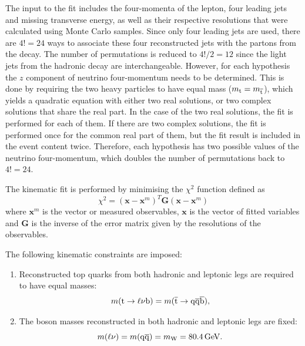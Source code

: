 The input to the fit includes the four-momenta of the lepton, four leading jets and missing transverse energy, as well
as their respective resolutions that were calculated using Monte Carlo samples. Since only four leading jets are used,
there are $4!=24$ ways to associate these four reconstructed jets with the partons from the \ttbar decay. The number of
permutations is reduced to $4!/2=12$ since the light jets from the hadronic \W decay are interchangeable. However, for
each hypothesis the $z$ component of neutrino four-momentum needs to be determined. This is done by requiring the two
heavy particles to have equal mass ($m_{\mathrm{t}} = m_{\overline{\mathrm{t}}}$), which yields a quadratic equation with either two real
solutions, or two complex solutions that share the real part. In the case of the two real solutions, the fit is
performed for each of them. If there are two complex solutions, the fit is performed once for the common real part of
them, but the fit result is included in the event content twice. Therefore, each hypothesis has two possible values of
the neutrino four-momentum, which doubles the number of permutations back to $4!=24$.

The kinematic fit is performed by minimising the $\chi^{2}$ function defined as
\begin{equation}
\chi^{2}  = (\mathbf{x} - \mathbf{x}^{m})^{T}\mathbf{G}(\mathbf{x} - \mathbf{x}^{m})
\end{equation}
where $\mathbf{x}^{m}$ is the vector or measured observables, $\mathbf{x}$ is the vector of fitted variables and
$\mathbf{G}$ is the inverse of the error matrix given by the resolutions of the observables.

The following kinematic constraints are imposed:
\begin{enumerate}[topsep=\parskip, parsep=\parskip, itemsep=\parskip, leftmargin=\leftmargin]
	\item Reconstructed top quarks from both hadronic and leptonic legs are required to have equal masses:
	\begin{equation}
		m(\mathrm{t} \to \ell \nu \mathrm{b}) = m(\overline{\mathrm{t}} \to \mathrm{q}\overline{\mathrm{q}} \overline{\mathrm{b}}),
	\end{equation}
	\item The \W boson masses reconstructed in both hadronic and leptonic legs are fixed:
	\begin{equation}
		m(\ell \nu) = m(\cPq\cPaq) = m_{\W} = \SI{80.4}{\GeV}.
	\end{equation}
\end{enumerate}

